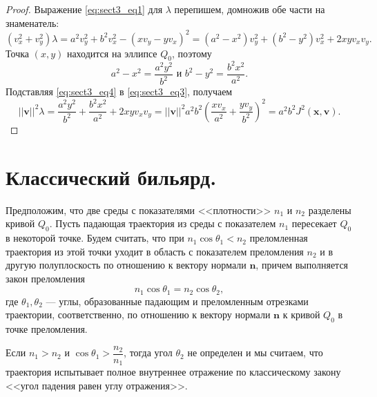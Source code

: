\begin{proof}
Выражение \eqref{eq:sect3_eq1} для $\lambda$ перепишем, домножив обе части на знаменатель:
\begin{equation}
(v_x^2 + v_y^2)\lambda = a^2 v_y^2 + b^2v_x^2 - (x v_y-y v_x)^2 = (a^2-x^2)v_y^2 + (b^2-y^2)v_x^2 + 2 x y v_x v_y.
\label{eq:sect3_eq3}
\end{equation}
Точка $(x, y)$ находится на эллипсе $Q_0$, поэтому
\begin{equation}
a^2 - x^2 = \frac{a^2 y^2}{b^2} \text{  и } b^2 - y^2 = \frac{b^2 x^2}{a^2}.
\label{eq:sect3_eq4}
\end{equation}
Подставляя \eqref{eq:sect3_eq4} в \eqref{eq:sect3_eq3}, получаем
$$||\mathbf{v}||^2 \lambda = \frac{a^2y^2}{b^2} + \frac{b^2 x^2}{a^2} + 2 x y v_x v_y = ||\mathbf{v}||^2 a^2b^2 \left( \frac{x v_x}{a^2} + \frac{y v_y}{b^2}\right)^2 = a^2b^2J^2(\mathbf{x}, \mathbf{v}).$$
\end{proof}

\section{Классический бильярд.}
Предположим, что две среды с показателями <<плотности>> $n_1$ и $n_2$ разделены кривой $Q_0$. Пусть падающая траектория из среды с показателем $n_1$ пересекает $Q_0$ в некоторой точке. Будем считать, что при $n_1 \cos \theta_1 < n_2$  преломленная траектория из этой точки уходит в область с показателем преломления $n_2$ и в другую полуплоскость по отношению к вектору нормали $\mathbf{n}$, причем выполняется  закон преломления 
 \begin{equation}
n_1 \cos{\theta_1} = n_2 \cos{\theta_2},
\label{eq:sect3_eq5}
\end{equation}
где $\theta_1, \theta_2$ --- углы, образованные падающим и преломленным отрезками траектории, соответственно, по отношению к вектору нормали $\mathbf{n}$ к кривой $Q_0$ в точке преломления.

Если $n_1 > n_2$ и $\cos \theta_1 > \dfrac{n_2}{n_1}$, тогда угол $\theta_2$ не определен и мы считаем, что траектория испытывает полное внутреннее отражение по классическому закону <<угол падения равен углу отражения>>. 

